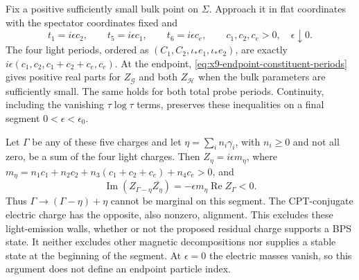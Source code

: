 Fix a positive sufficiently small bulk point on $\Sigma$. Approach it
in flat coordinates with the spectator coordinates fixed and
\begin{equation}
 t_1=i\epsilon c_2,\qquad t_5=i\epsilon c_1,\qquad
 t_6=i\epsilon c_e,\qquad c_1,c_2,c_e>0,\quad\epsilon\downarrow0.
 \label{eq:x9-light-electric-ray}
\end{equation}
The four light periods, ordered as $(C_1,C_2,\iota_*e_1,\iota_*e_2)$,
are exactly $i\epsilon(c_1,c_2,c_1+c_2+c_e,c_e)$. At the endpoint,
\eqref{eq:x9-endpoint-constituent-periods} gives positive real parts
for $Z_{\mathcal G}$ and both $Z_{\mathcal H}$ when the bulk
parameters are sufficiently small. The same holds for both total
probe periods. Continuity, including the vanishing
$\tau\log\tau$ terms, preserves these inequalities on a final
segment $0<\epsilon<\epsilon_0$.

Let $\Gamma$ be any of these five charges and let
$\eta=\sum_i n_i\gamma_i$, with $n_i\geq0$ and not all zero,
be a sum of the four light charges. Then
$Z_\eta=i\epsilon m_\eta$, where
$m_\eta=n_1c_1+n_2c_2+n_3(c_1+c_2+c_e)+n_4c_e>0$, and
\begin{equation}
 \operatorname{Im}(Z_{\Gamma-\eta}\overline{Z_\eta})
 =-\epsilon m_\eta\operatorname{Re}Z_\Gamma<0.
 \label{eq:x9-light-emission-sign}
\end{equation}
Thus $\Gamma\to(\Gamma-\eta)+\eta$ cannot be marginal on this
segment. The CPT-conjugate electric charge has the opposite, also
nonzero, alignment. This excludes these light-emission walls, whether
or not the proposed residual charge supports a BPS state. It neither
excludes other magnetic decompositions nor supplies a stable state at
the beginning of the segment. At $\epsilon=0$ the electric masses
vanish, so this argument does not define an endpoint particle index.

